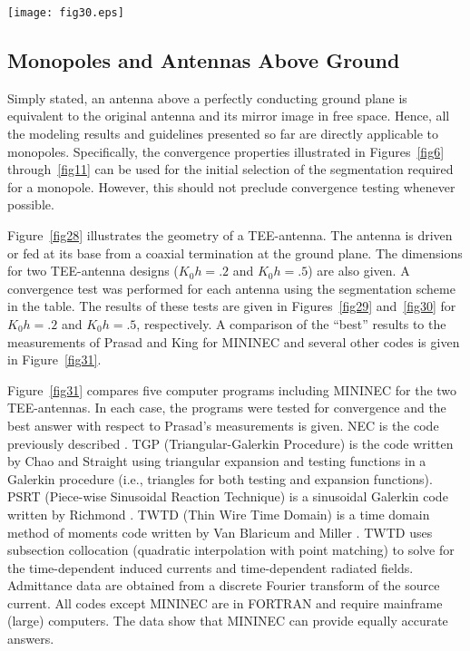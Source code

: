 \documentclass[12pt]{article}
\begin{document}
\begin{sidewaysfigure}[htb]
\centerline{\texttt{[image: fig30.eps]}}
\caption{Convergence test for a TEE antenna with $K_0 h = .5$}
\label{fig30}
\end{sidewaysfigure}

\subsection{Monopoles and Antennas Above Ground}
\label{sec-monopoles}
Simply stated, an antenna above a perfectly conducting ground plane is
equivalent to the original antenna and its mirror image in free space.
Hence, all the modeling results and guidelines presented so far are
directly applicable to monopoles. Specifically, the convergence
properties illustrated in Figures~\ref{fig6} through~\ref{fig11} can be
used for the initial selection of the segmentation required for a
monopole. However, this should not preclude convergence testing whenever
possible.

Figure~\ref{fig28} illustrates the geometry of a TEE-antenna. The
antenna is driven or fed at its base from a coaxial termination at the
ground plane. The dimensions for two TEE-antenna designs ($K_0 h = .2$
and $K_0 h = .5$) are also given. A convergence test was performed for
each antenna using the segmentation scheme in the table. The results of
these tests are given in Figures~\ref{fig29} and~\ref{fig30} for
$K_0 h = .2$ and $K_0 h = .5$, respectively. A comparison of the
``best'' results to the measurements of Prasad and King
\cite{r18} for MININEC and several other codes is given in
Figure~\ref{fig31}.

Figure~\ref{fig31} compares five computer programs including MININEC for
the two TEE-antennas. In each case, the programs were tested for
convergence and the best answer with respect to Prasad's measurements is
given. NEC is the code previously described \cite{r4}. TGP
(Triangular-Galerkin Procedure) is the code written by Chao and Straight
\cite{r11} using triangular expansion and testing functions
in a Galerkin procedure (i.e., triangles for both testing and expansion
functions). PSRT (Piece-wise Sinusoidal Reaction Technique) is a
sinusoidal Galerkin code written by Richmond \cite{r19}.
TWTD (Thin Wire Time Domain) is a time domain method of moments code
written by Van Blaricum and Miller \cite{r20}. TWTD uses
subsection collocation (quadratic interpolation with point matching) to
solve for the time-dependent induced currents and time-dependent
radiated fields. Admittance data are obtained from a discrete Fourier
transform of the source current. All codes except MININEC are in FORTRAN
and require mainframe (large) computers. The data show that MININEC can
provide equally accurate answers.
\end{document}
